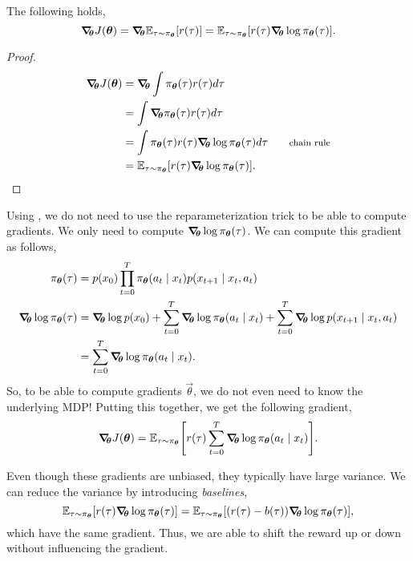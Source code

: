 \begin{theorem}
  The following holds, \[
    \bm{\nabla}_{\!\! \bm{\theta}} J(\bm{\theta}) = \bm{\nabla}_{\!\! \bm{\theta}} \mathbb{E}_{\tau \sim \pi_{\bm{\theta}}} [r(\tau)] = \mathbb{E}_{\tau\sim \pi_{\bm{\theta}}}[r(\tau)\bm{\nabla}_{\!\! \bm{\theta}} \log \pi_{\bm{\theta}}(\tau)]
  .\]

  \label{thm:reinforce-grad}
\end{theorem}

\begin{proof}
  \begin{align*}
    \grad{J(\vec{\theta})}{\vec{\theta}} &= \grad{\int \pi_{\vec{\theta}}(\tau) r(\tau) d\tau}{\vec{\theta}} \\
    &= \int \grad{\pi_{\vec{\theta}}(\tau) r(\tau)}{\vec{\theta}} d\tau \\
    &= \int \pi_{\vec{\theta}}(\tau) r(\tau) \grad{\log \pi_{\vec{\theta}}(\tau)}{\vec{\theta}} d\tau & \text{\footnotesize chain rule} \\
    &= \E_{\tau\sim \pi_{\vec{\theta}}}[r(\tau)\grad{\log \pi_{\vec{\theta}}(\tau)}{\vec{\theta}}]
  .\end{align*}
\end{proof}

Using , we do not need to use the reparameterization
trick to be able to compute gradients. We only need to compute $\bm{\nabla}_{\!\! \bm{\theta}} \log
\pi_{\bm{\theta}}(\tau)$. We can compute this gradient as
follows,
\begin{align*}
  \pi_{\vec{\theta}}(\tau) &= p(x_0) \prod_{t=0}^T \pi_{\vec{\theta}}(a_t\mid x_t) p(x_{t+1}\mid x_t,a_t) \\
  \grad{\log \pi_{\vec{\theta}}(\tau)}{\vec{\theta}} &= \grad{\log p(x_0)}{\vec{\theta}} + \sum_{t=0}^T \grad{\log \pi_{\vec{\theta}}(a_t \mid x_t)}{\vec{\theta}} + \sum_{t=0}^T \grad{\log p(x_{t+1}\mid x_t,a_t)}{\vec{\theta}} \\
  &= \sum_{t=0}^T \grad{\log \pi_{\vec{\theta}}(a_t \mid x_t)}{\vec{\theta}}
.\end{align*}
So, to be able to compute gradients \wrt $\vec{\theta}$, we do not even need to
know the underlying MDP! Putting this together, we get the following gradient, \[
  \grad{J(\vec{\theta})}{\vec{\theta}} = \E_{\tau\sim \pi_{\vec{\theta}}} \lft[ r(\tau) \sum_{t=0}^T \grad{\log \pi_{\vec{\theta}}(a_t \mid x_t)}{\vec{\theta}} \rgt]
.\]

Even though these gradients are unbiased, they typically have large variance. We
can reduce the variance by introducing \textit{baselines}, \[
  \mathbb{E}_{\tau\sim \pi_{\bm{\theta}}}[r(\tau)\bm{\nabla}_{\!\! \bm{\theta}} \log \pi_{\bm{\theta}}(\tau)] = \mathbb{E}_{\tau\sim \pi_{\bm{\theta}}}[(r(\tau) - b(\tau))\bm{\nabla}_{\!\! \bm{\theta}} \log \pi_{\bm{\theta}}(\tau)]
,\]
which have the same gradient. Thus, we are able to shift the reward up or down
without influencing the gradient.

